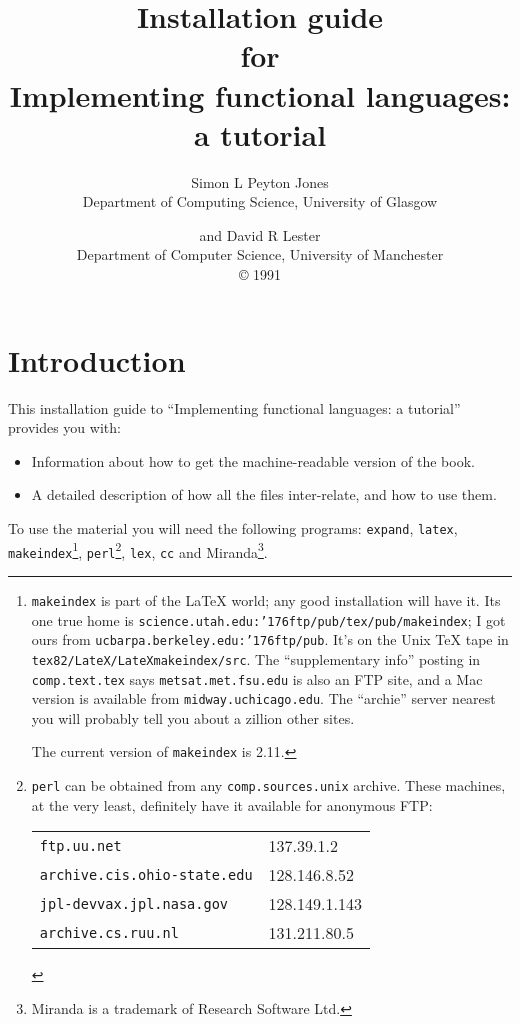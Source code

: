 \batchmode
{}



\title{Installation guide\\
for\\
Implementing functional languages: a tutorial}
\author{Simon L Peyton Jones \\ 
        Department of Computing Science, University of Glasgow
\and
        and David R Lester \\
         Department of Computer Science, University of Manchester\\
         \copyright{} 1991}

\maketitle

\chapter{Introduction}

This installation guide to ``Implementing functional languages: a tutorial''
provides you with:
\begin{itemize}
\item
Information about how to get the machine-readable version of the book.
\item
A detailed description of how all the files inter-relate, and how to 
use them.
\end{itemize}

To use the material you will need the following programs: 
\mbox{\tt expand}, \mbox{\tt latex}, \mbox{\tt makeindex}\footnote{
\mbox{\tt makeindex} is part of the \LaTeX{} world; any good installation will have it.
Its one true home is \mbox{\tt science.utah.edu:{\char'176}ftp/pub/tex/pub/makeindex}; I
got ours from \mbox{\tt ucbarpa.berkeley.edu:{\char'176}ftp/pub}.  It's on the Unix \TeX{}
tape in \mbox{\tt tex82/LateX/LateXmakeindex/src}.  The ``supplementary info''
posting in \mbox{\tt comp.text.tex} says \mbox{\tt metsat.met.fsu.edu} is also an FTP site,
and a Mac version is available from \mbox{\tt midway.uchicago.edu}.  The ``archie''
server nearest you will probably tell you about a zillion other sites.

The current version of \mbox{\tt makeindex} is 2.11.
}, \mbox{\tt perl}\footnote{
\mbox{\tt perl} can be obtained from any \mbox{\tt comp.sources.unix} 
archive.  These machines, at the very least,
definitely have it available for anonymous FTP:
\begin{tabular}{ll}
\mbox{\tt ftp.uu.net}                    &       137.39.1.2 \\
\mbox{\tt archive.cis.ohio-state.edu}    &       128.146.8.52 \\
\mbox{\tt jpl-devvax.jpl.nasa.gov}       &       128.149.1.143 \\
\mbox{\tt archive.cs.ruu.nl}             &       131.211.80.5
\end{tabular}
}, \mbox{\tt lex}, \mbox{\tt cc} 
and Miranda\footnote{Miranda is a trademark of 
Research Software Ltd.}.

